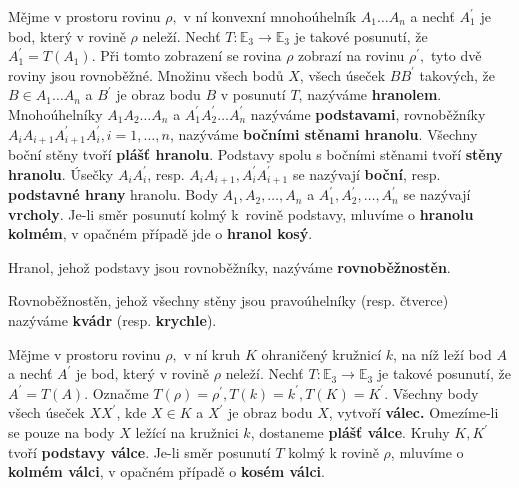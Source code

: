 \begin{definition}
    Mějme v prostoru rovinu $\rho,$ v ní konvexní mnohoúhelník $A_1\dots A_n$ a nechť
    $A_1^\prime$ je bod, který v rovině $\rho$ neleží. Nechť $T: \mathbb E_3 \to
    \mathbb E_3$ je takové posunutí, že $A_1^\prime=T(A_1).$ Při tomto zobrazení se rovina
    $\rho$ zobrazí na rovinu $\rho^\prime,$ tyto dvě roviny jsou rovnoběžné. Množinu všech
    bodů $X$, všech úseček $BB^\prime$ takových, že $B\in A_1\dots A_n$ a $B^\prime$ je
    obraz bodu $B$ v posunutí $T$, nazýváme \textbf{hranolem}. Mnohoúhelníky
    $A_1A_2\dots A_n$ a $A^\prime_1A^\prime_2\dots A^\prime_n$ nazýváme \textbf{podstavami},
    rovnoběžníky $A_iA_{i+1}A^\prime_{i+1}A_i^\prime, i=1,\dots,n$, nazýváme
    \textbf{bočními stěnami hranolu}. Všechny boční stěny tvoří \textbf{plášť hranolu}.
    Podstavy spolu s bočními stěnami tvoří \textbf{stěny hranolu}. Úsečky $A_iA^\prime_i$,
    resp. $A_iA_{i+1}, A^\prime_iA^\prime_{i+1}$ se nazývají \textbf{boční}, resp. \textbf{podstavné hrany}
    hranolu. Body $A_1,A_2,\dots,A_n$ a $A^\prime_1,A^\prime_2,\dots,A^\prime_n$ se
    nazývají \textbf{vrcholy}. Je-li směr posunutí kolmý k~rovině podstavy, mluvíme
    o \textbf{hranolu kolmém}, v opačném případě jde o \textbf{hranol kosý}.
\end{definition}

\begin{definition}
    Hranol, jehož podstavy jsou rovnoběžníky, nazýváme \textbf{rovnoběžnostěn}.
\end{definition}

\begin{definition}
    Rovnoběžnostěn, jehož všechny stěny jsou pravoúhelníky (resp. čtverce) nazýváme
    \textbf{kvádr} (resp. \textbf{krychle}).
\end{definition}

\begin{definition}
    Mějme v prostoru rovinu $\rho,$ v ní kruh $K$ ohraničený kružnicí $k$, na níž
    leží bod $A$ a nechť
    $A^\prime$ je bod, který v rovině $\rho$ neleží. Nechť $T: \mathbb E_3 \to
    \mathbb E_3$ je takové posunutí, že $A^\prime=T(A).$ Označme $T(\rho)=\rho^\prime,
    T(k)=k^\prime, T(K)=K^\prime.$ Všechny body všech úseček $XX^\prime$, kde $X\in K$
    a $X^\prime$ je obraz bodu $X$, vytvoří \textbf{válec.} Omezíme-li se pouze na
    body $X$ ležící na kružnici $k$, dostaneme \textbf{plášť válce}. Kruhy $K,K^\prime$
    tvoří \textbf{podstavy válce}. Je-li směr posunutí $T$ kolmý k rovině $\rho$,
    mluvíme o \textbf{kolmém válci}, v opačném případě o \textbf{kosém válci}.
\end{definition}

